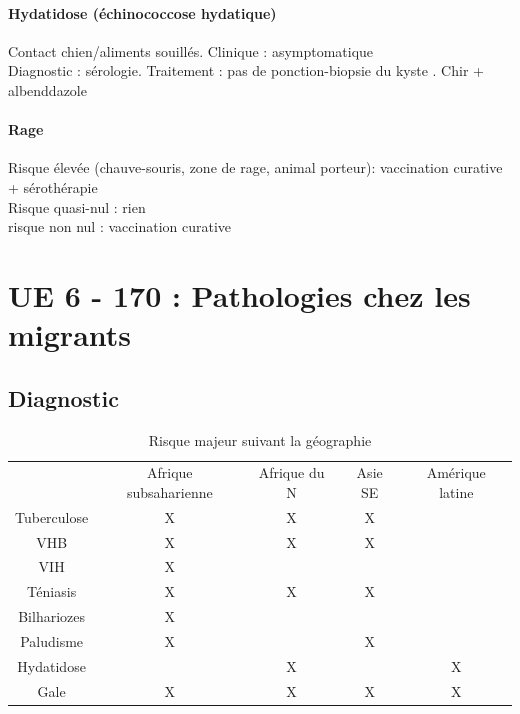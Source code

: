 \documentclass{article}
\newcommand*{\TakeFourierOrnament}[1]{{%
\fontencoding{U}\fontfamily{futs}\selectfont\char#1}}
\newcommand*{\danger}{\TakeFourierOrnament{66}}
\begin{document}
\paragraph{Hydatidose (échinococcose hydatique)} Contact chien/aliments
souillés.
Clinique : asymptomatique\\
Diagnostic : sérologie.
Traitement : pas de ponction-biopsie du kyste \danger. Chir + albenddazole

\paragraph{Rage} 
Risque élevée (chauve-souris, zone de rage, animal porteur): vaccination
curative + sérothérapie\\
Risque quasi-nul : rien\\
risque non nul : vaccination curative
 
\section{UE 6 - 170 : Pathologies chez les migrants}%
\label{sec:ue_6_170_pathologies_chez_les_migrants}
\subsection{Diagnostic}

\begin{table}[htpb]
  \centering
  \caption{Risque majeur suivant la géographie}
  \begin{tabular}{*{5}{c}}
  \toprule
               & Afrique subsaharienne & Afrique du N & Asie SE & Amérique latine \\
 Tuberculose   & X                     & X            & X\\
    VHB
               & X                     & X            & X\\
 VIH           & X \\
 Téniasis      & X                     & X            & X\\
 Bilhariozes   & X \\
 Paludisme     & X                     &              & X \\
 Hydatidose    &                       & X            &         & X\\
 Gale          & X                     & X            & X       & X \\
  \midrule
  \bottomrule
  \end{tabular}
\end{table}
\end{document}
